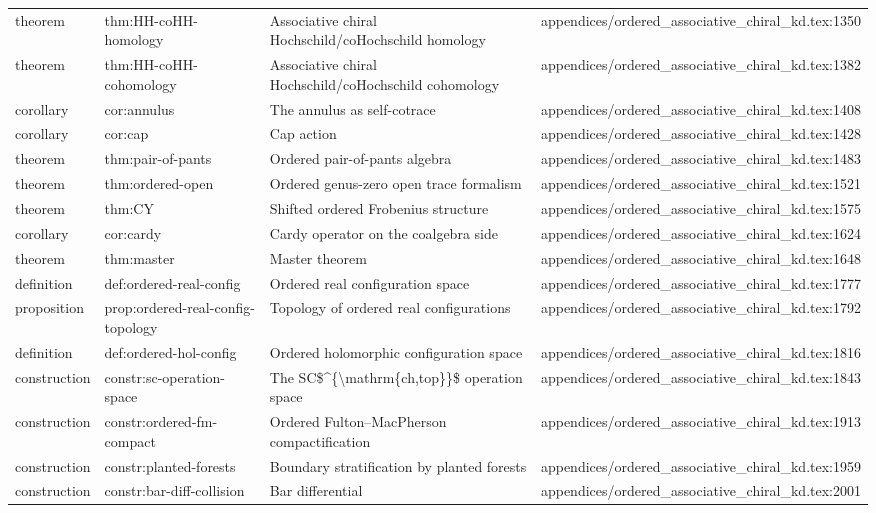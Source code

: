 \documentclass[11pt]{article}
\begin{document}
\begin{longtable}{L{0.10\textwidth}L{0.26\textwidth}L{0.42\textwidth}L{0.22\textwidth}}
theorem & thm:HH-coHH-homology & Associative chiral Hochschild/coHochschild homology & appendices/ordered\_associative\_chiral\_kd.tex:1350\\
theorem & thm:HH-coHH-cohomology & Associative chiral Hochschild/coHochschild cohomology & appendices/ordered\_associative\_chiral\_kd.tex:1382\\
corollary & cor:annulus & The annulus as self-cotrace & appendices/ordered\_associative\_chiral\_kd.tex:1408\\
corollary & cor:cap & Cap action & appendices/ordered\_associative\_chiral\_kd.tex:1428\\
theorem & thm:pair-of-pants & Ordered pair-of-pants algebra & appendices/ordered\_associative\_chiral\_kd.tex:1483\\
theorem & thm:ordered-op{}en & Ordered genus-zero op{}en trace formalism & appendices/ordered\_associative\_chiral\_kd.tex:1521\\
theorem & thm:CY & Shifted ordered Frobenius structure & appendices/ordered\_associative\_chiral\_kd.tex:1575\\
corollary & cor:cardy & Cardy operator on the coalgebra side & appendices/ordered\_associative\_chiral\_kd.tex:1624\\
theorem & thm:master & Master theorem & appendices/ordered\_associative\_chiral\_kd.tex:1648\\
definition & def:ordered-real-config & Ordered real configuration space & appendices/ordered\_associative\_chiral\_kd.tex:1777\\
proposition & prop:ordered-real-config-topology & Topology of ordered real configurations & appendices/ordered\_associative\_chiral\_kd.tex:1792\\
definition & def:ordered-hol-config & Ordered holomorphic configuration space & appendices/ordered\_associative\_chiral\_kd.tex:1816\\
construction & constr:sc-operation-space & The SC\$\textasciicircum{}\{\textbackslash{}mathrm\{ch,top\}\}\$ operation space & appendices/ordered\_associative\_chiral\_kd.tex:1843\\
construction & constr:ordered-fm-compact & Ordered Fulton--MacPherson compactification & appendices/ordered\_associative\_chiral\_kd.tex:1913\\
construction & constr:planted-forests & Boundary stratification by planted forests & appendices/ordered\_associative\_chiral\_kd.tex:1959\\
construction & constr:bar-diff-collision & Bar differential & appendices/ordered\_associative\_chiral\_kd.tex:2001\\

\end{longtable}
\end{document}
